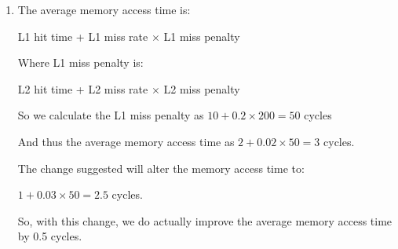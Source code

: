 \begin{enumerate}[label=(\alph*)]
  \item

    The average memory access time is:

    L1 hit time + L1 miss rate $\times$ L1 miss penalty

    Where L1 miss penalty is:

    L2 hit time + L2 miss rate $\times$ L2 miss penalty


    So we calculate the L1 miss penalty as $10 + 0.2 \times 200 = 50$ cycles

    And thus the average memory access time as $2 + 0.02 \times 50 = 3$ cycles.

    The change suggested will alter the memory access time to:

    $1 + 0.03 \times 50 = 2.5$ cycles.

    So, with this change, we do actually improve the average memory access time by 0.5 cycles.



        
    \end{enumerate}

